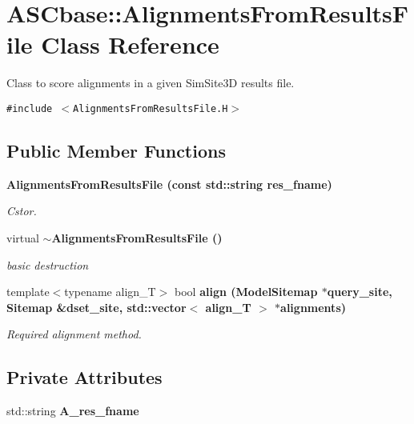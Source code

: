 \section{ASCbase::Alignments\-From\-Results\-File Class Reference}
\label{classASCbase_1_1AlignmentsFromResultsFile}
Class to score alignments in a given Sim\-Site3D results file.  


{\tt \#include $<$Alignments\-From\-Results\-File.H$>$}

\subsection*{Public Member Functions}
\begin{CompactItemize}
\item 
\bf{Alignments\-From\-Results\-File} (const std::string res\_\-fname)\label{classASCbase_1_1AlignmentsFromResultsFile_0834e02449a91cc81b01e44566b3ca9c}

\begin{CompactList}\small\item\em Cstor. \item\end{CompactList}\item 
virtual \bf{$\sim$Alignments\-From\-Results\-File} ()\label{classASCbase_1_1AlignmentsFromResultsFile_ac17079e981f15b11ff09284843f1c60}

\begin{CompactList}\small\item\em basic destruction \item\end{CompactList}\item 
template$<$typename align\_\-T$>$ bool \bf{align} (\bf{Model\-Sitemap} $\ast$query\_\-site, \bf{Sitemap} \&dset\_\-site, std::vector$<$ align\_\-T $>$ $\ast$alignments)\label{classASCbase_1_1AlignmentsFromResultsFile_8a607016b81b625aa0debaa1d469067d}

\begin{CompactList}\small\item\em Required alignment method. \item\end{CompactList}\end{CompactItemize}
\subsection*{Private Attributes}
\begin{CompactItemize}
\item 
std::string \textbf{A\_\-res\_\-fname}\label{classASCbase_1_1AlignmentsFromResultsFile_629d9546382d3f8879e8a324b392584e}

\end{CompactItemize}


